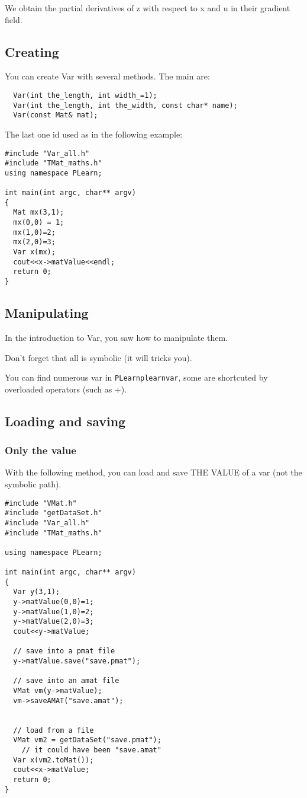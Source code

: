 \documentclass[11pt]{book}
\begin{document}
 We obtain the partial derivatives of z with respect to x and u in their
 gradient field.


\subsection{Creating}

You can create Var with several methods.
The main are:
\begin{verbatim}
  Var(int the_length, int width_=1);
  Var(int the_length, int the_width, const char* name);
  Var(const Mat& mat);
\end{verbatim}

The last one id used as in the following example:
\begin{verbatim}
#include "Var_all.h"
#include "TMat_maths.h"
using namespace PLearn;

int main(int argc, char** argv)
{
  Mat mx(3,1);
  mx(0,0) = 1;
  mx(1,0)=2;
  mx(2,0)=3;
  Var x(mx);
  cout<<x->matValue<<endl;
  return 0;
}
\end{verbatim}

\subsection{Manipulating}

In the introduction to Var, you saw how to manipulate them.

Don't forget that all is symbolic (it will tricks you).

You can find numerous var in \texttt{PLearn\/plearn\/var}, some are shortcuted by overloaded operators (such as +).

\subsection{Loading and saving}

\subsubsection{Only the value}

With the following method, you can load and save THE VALUE of a var (not the symbolic path). 
\begin{verbatim}
#include "VMat.h"
#include "getDataSet.h"
#include "Var_all.h"
#include "TMat_maths.h"

using namespace PLearn;

int main(int argc, char** argv)
{
  Var y(3,1);
  y->matValue(0,0)=1;
  y->matValue(1,0)=2;
  y->matValue(2,0)=3;
  cout<<y->matValue;

  // save into a pmat file
  y->matValue.save("save.pmat");

  // save into an amat file
  VMat vm(y->matValue);
  vm->saveAMAT("save.amat");


  // load from a file
  VMat vm2 = getDataSet("save.pmat");
    // it could have been "save.amat"
  Var x(vm2.toMat());
  cout<<x->matValue;
  return 0;
}
\end{verbatim}
\end{document}
